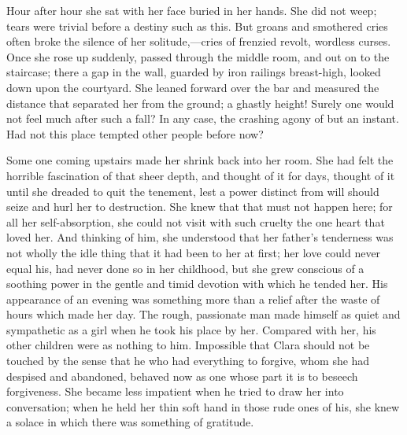 Hour after hour she sat with her face buried in her hands. She did not
weep; tears were {\protect\hypertarget{61}{}{}}trivial before a destiny
such as this. But groans and smothered cries often broke the silence of
her solitude,---cries of frenzied revolt, wordless curses. Once she rose
up suddenly, passed through the middle room, and out on to the
staircase; there a gap in the wall, guarded by iron railings
breast-high, looked down upon the courtyard. She leaned forward over the
bar and measured the distance that separated her from the ground; a
ghastly height! Surely one would not feel much after such a fall? In any
case, the crashing agony of but an instant. Had not this place tempted
other people before now?

Some one coming upstairs made her shrink back into her room. She had
felt the horrible fascination of that sheer depth, and thought of it for
days, thought of it until she dreaded to quit the tenement, lest a power
distinct from will should seize and hurl her to destruction. She knew
that that must not happen here; for all her self-absorption, she could
not visit with such cruelty the one heart that loved her. And thinking
of him, she understood that her father's tenderness was not wholly the
idle thing that it had been to her at first; her love could never
{\protect\hypertarget{62}{}{}}equal his, had never done so in her
childhood, but she grew conscious of a soothing power in the gentle and
timid devotion with which he tended her. His appearance of an evening
was something more than a relief after the waste of hours which made her
day. The rough, passionate man made himself as quiet and sympathetic as
a girl when he took his place by her. Compared with her, his other
children were as nothing to him. Impossible that Clara should not be
touched by the sense that he who had everything to forgive, whom she had
despised and abandoned, behaved now as one whose part it is to beseech
forgiveness. She became less impatient when he tried to draw her into
conversation; when he held her thin soft hand in those rude ones of his,
she knew a solace in which there was something of gratitude.

